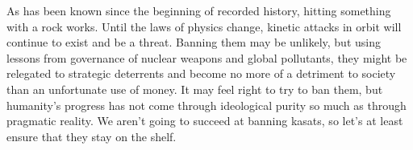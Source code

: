 As has been known since the beginning of recorded history, hitting
something with a rock works.  Until the laws of physics change,
kinetic attacks in orbit will continue to exist and be a threat.
Banning them may be unlikely, but using lessons from governance of
nuclear weapons and global pollutants, they might be relegated to
strategic deterrents and become no more of a detriment to society than
an unfortunate use of money.  It may feel right to try to ban them,
but humanity's progress has not come through ideological purity so
much as through pragmatic reality.  We aren't going to succeed at
banning \aclp{kasat}, so let's at least ensure that they stay on the
shelf.
